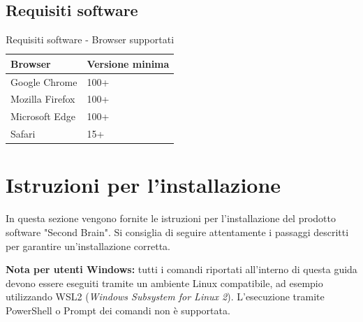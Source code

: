 \documentclass[a4paper,10pt]{article}
\begin{document}
\subsection{Requisiti software}
\begin{table}[H]
\centering
\renewcommand{\arraystretch}{1.3}
\begin{tabular}{|l|l|}
\hline
\textbf{Browser} & \textbf{Versione minima} \\ \hline

Google Chrome & 100+ \\ 
Mozilla Firefox & 100+ \\ 
Microsoft Edge & 100+ \\ 
Safari & 15+ \\ \hline

\end{tabular}
\caption{Requisiti software - Browser supportati}
\end{table}

\section{Istruzioni per l'installazione}
In questa sezione vengono fornite le istruzioni per l'installazione del prodotto software "Second Brain". Si consiglia di seguire attentamente i passaggi descritti per garantire un'installazione corretta.

\textbf{Nota per utenti Windows:} tutti i comandi riportati all'interno di questa guida devono essere eseguiti tramite un ambiente Linux compatibile, ad esempio utilizzando WSL2 (\textit{Windows Subsystem for Linux 2}). L'esecuzione tramite PowerShell o Prompt dei comandi non è supportata.
\end{document}
